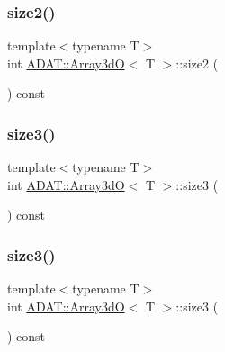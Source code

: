 \mbox{\label{classADAT_1_1Array3dO_ab4a1fc3cfddf9238d7ab3fefac03ad18}} 
\subsubsection{\texorpdfstring{size2()}{size2()}\hspace{0.1cm}{\footnotesize\ttfamily [3/3]}}
{\footnotesize\ttfamily template$<$typename T$>$ \\
int \mbox{\hyperlink{classADAT_1_1Array3dO}{A\+D\+A\+T\+::\+Array3dO}}$<$ T $>$\+::size2 (\begin{DoxyParamCaption}{ }\end{DoxyParamCaption}) const\hspace{0.3cm}{\ttfamily [inline]}}

\mbox{\label{classADAT_1_1Array3dO_acd5ccea08cb9cde541a396823af21161}} 
\subsubsection{\texorpdfstring{size3()}{size3()}\hspace{0.1cm}{\footnotesize\ttfamily [1/3]}}
{\footnotesize\ttfamily template$<$typename T$>$ \\
int \mbox{\hyperlink{classADAT_1_1Array3dO}{A\+D\+A\+T\+::\+Array3dO}}$<$ T $>$\+::size3 (\begin{DoxyParamCaption}{ }\end{DoxyParamCaption}) const\hspace{0.3cm}{\ttfamily [inline]}}

\mbox{\label{classADAT_1_1Array3dO_acd5ccea08cb9cde541a396823af21161}} 
\subsubsection{\texorpdfstring{size3()}{size3()}\hspace{0.1cm}{\footnotesize\ttfamily [2/3]}}
{\footnotesize\ttfamily template$<$typename T$>$ \\
int \mbox{\hyperlink{classADAT_1_1Array3dO}{A\+D\+A\+T\+::\+Array3dO}}$<$ T $>$\+::size3 (\begin{DoxyParamCaption}{ }\end{DoxyParamCaption}) const\hspace{0.3cm}{\ttfamily [inline]}}

